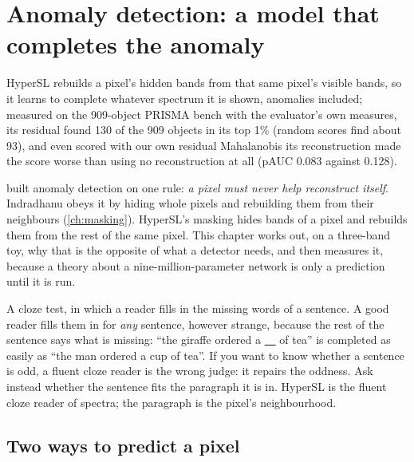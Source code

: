 \chapter{Anomaly detection: a model that completes the anomaly}\label{ch:hsldetect}
\def\tbrk{\hfil\penalty50\hfilneg}%

\begin{onething}
HyperSL rebuilds a pixel's hidden bands from that same pixel's visible bands, so it learns to complete whatever spectrum
it is shown, anomalies included; measured on the 909-object PRISMA bench with the evaluator's own measures, its residual
found 130 of the 909 objects in its top 1\% (random scores find about 93), and even scored with our own residual
Mahalanobis its reconstruction made the score worse than using no reconstruction at all (pAUC 0.083 against 0.128).
\end{onething}

 built anomaly detection on one rule: \emph{a pixel must never help reconstruct itself}. Indradhanu obeys
it by hiding whole pixels and rebuilding them from their neighbours (\cref{ch:masking}). HyperSL's masking hides bands
of a pixel and rebuilds them from the rest of the same pixel. This chapter works out, on a three-band toy, why that is
the opposite of what a detector needs, and then measures it, because a theory about a nine-million-parameter network is
only a prediction until it is run.

\begin{analogy}
A cloze test, in which a reader fills in the missing words of a sentence. A good reader fills them in for \emph{any}
sentence, however strange, because the rest of the sentence says what is missing: ``the giraffe ordered a \underline{\ \
} of tea'' is completed as easily as ``the man ordered a cup of tea''. If you want to know whether a sentence is odd, a
fluent cloze reader is the wrong judge: it repairs the oddness. Ask instead whether the sentence fits the paragraph it is
in. HyperSL is the fluent cloze reader of spectra; the paragraph is the pixel's neighbourhood.
\end{analogy}

\section{Two ways to predict a pixel}\label{sec:hsldetect:two}

